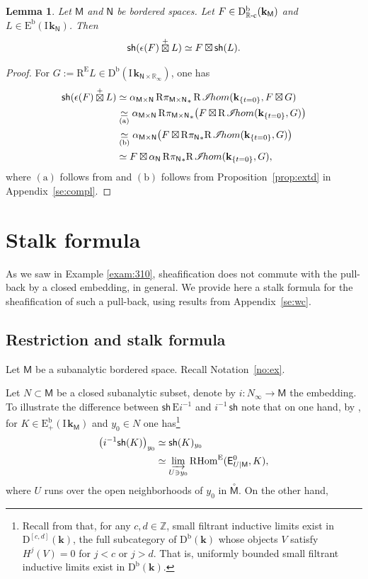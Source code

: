\documentclass[11pt]{article}
\numberwithin{equation}{section}
\let\mathcal\mathscr
\newcommand{\accentset}[2]{\overset{#1}{#2}}
\newcommand{\bl}{\bigl(}
\newcommand{\br}{\bigr)}
\theoremstyle{plain}
\newtheorem{lemma}[theorem]{Lemma}
\theoremstyle{definition}
\newcommand{\R}{\mathbb{R}}
\newcommand{\Z}{\mathbb{Z}}
\newcommand{\bR}{{\R_\infty}}
\newcommand{\derived}[1]{\mathrm{#1}}
\newcommand{\derd}{\derived{D}}
\newcommand{\dere}{\derived{E}}\let\enh\dere
\newcommand{\derr}{\derived{R}}
\newcommand{\BDC}{\derd^{\mathrm{b}}}
\newcommand{\BEC}[2][\ifield]{\dere^{\mathrm{b}}(#1_{#2})}
\newcommand{\BECp}[2][\ifield]{\dere^{\mathrm{b}}_+(#1_{#2})}
\newcommand{\RHom}[1][]{\derr\mathrm{Hom}_{\raise1.5ex\hbox to.1em{}#1}}
\newcommand{\roim}[1]{\derr#1_*}
\newcommand{\FHom}{\RHom^\enh}
\newcommand{\rihom}{{\derr\mspace{2mu}\shi\!hom}}
\newcommand{\etens}[1][]{\mathbin{\boxtimes_{\raise1.5ex\hbox to-.1em{}#1}}}
\newcommand{\sheaffont}[1]{\mathcal{#1}}
\newcommand\shi{\sheaffont{I}}
\newcommand{\RE}{\operatorname{R^\enh}}
\newcommand{\Eopb}[1]{\enh#1^{-1}}
\newcommand{\Rc}{{\R\text-\mathrm{c}}}
\newcommand{\field}{\mathbf{k}}\let\cor\field
\newcommand{\ind}{\mathrm{I}\mspace{2mu}}
\newcommand{\ifield}{\ind\field}
\newcommand{\unbordered}[1]{{\accentset{\circ}{#1}}}
\newcommand{\inbordered}[1]{{#1_\infty}}
\newcommand{\cetens}{\mathbin{\mathop\boxtimes\limits^+}}
\newcommand{\ex}{\mathsf{E}}\let\exx\ex
\newcommand{\sh}{\mathsf{sh}}
\newcommand{\bbM}{\mathsf{M}}
\newcommand{\obM}{\unbordered{\bbM}}
\newcommand{\bbN}{\mathsf{N}}
\newcommand{\bN}{\inbordered{N}}
\newcommand{\defeq}{\mathbin{:=}}\let \seteq\defeq
\newcommand{\ilim}[1][]{\mathop{\varinjlim}\limits_{#1}}
\newcommand{\st}[1]{{\{{#1}\}}}
\newcommand{\opb}[1]{#1^{-1}}
\begin{document}
\begin{lemma}\label{lem:shetens}
Let $\bbM$ and $\bbN$ be bordered spaces.
Let $F\in\BDC_\Rc(\field_\bbM)$ and $L\in\BEC\bbN$. Then
\[
\sh(\epsilon(F)\cetens L) \simeq F \etens \sh(L).
\]
\end{lemma}

\begin{proof}
For $G\defeq\RE L\in\BDC(\ifield_{\bbN\times\bR})$, one has
\begin{align*}
\sh(\epsilon(F)\cetens L)
&\simeq \alpha_{\bbM\times\bbN}\,\roim{{\pi_{\bbM\times\bbN}}}\,\rihom(\field_{\st{t= 0}}, F\etens G) \\
&\underset{(\text{a})}\simeq \alpha_{\bbM\times\bbN}\,\roim{{\pi_{\bbM\times\bbN}}}
\bl F\etens\rihom(\field_{\st{t= 0}}, G)\br \\
&\underset{(\text{b})}\simeq \alpha_{\bbM\times\bbN}\bl F\etens
\roim{{\pi_{\bbN}}}\rihom(\field_{\st{t= 0}}, G)\br \\
&\simeq F\etens\alpha_\bbN\,\roim{{\pi_\bbN}}\rihom(\field_{\st{t= 0}}, G) ,
\end{align*}
where $(\text{a})$ follows from \cite[Cor.\,2.3.5]{DK16}
and $(\text{b})$ follows from Proposition~\ref{prop:extd} in Appendix~\ref{se:compl}.
\end{proof}

\section{Stalk formula}\label{se:germ}

As we saw in Example \ref{exam:310}, sheafification does not commute with the pull-back by a closed embedding, in general. We provide here a stalk formula for the sheafification of such a pull-back, using results from Appendix~\ref{se:wc}.

\subsection{Restriction and stalk formula}

Let $\bbM$ be a subanalytic bordered space.
Recall Notation~\ref{no:ex}.

Let $N\subset\bbM$ be a closed subanalytic subset, denote by $i\colon \bN\to \bbM$ the embedding.
To illustrate the difference between $\sh\,\Eopb i$ and $\opb i \, \sh$ note that on one hand, by \hbox{\cite[Lem.\,2.4.1]{DK18}}, for $K\in\BECp \bbM$ and $y_0\in N$ one has\footnote{Recall from \cite[\S2.1]{DK18} that, for any $c,d\in\Z$, small filtrant inductive limits exist in $\derd^{[c,d]}(\field)$, the full subcategory of $\BDC(\field)$ whose objects $V$ satisfy $H^j(V)=0$ for $j<c$ or $j>d$. That is, uniformly bounded small filtrant inductive limits exist in $\BDC(\field)$.}
\begin{align*}
\bl \opb i \sh(K)\br_{y_0} &\simeq
\sh(K)_{y_0} \\ &\simeq
\ilim[U\owns y_0]\FHom(\ex^0_{U|\bbM},K),
\end{align*}
where $U$ runs over the open neighborhoods of $y_0$ in $\obM$.
On the other hand,
\end{document}
